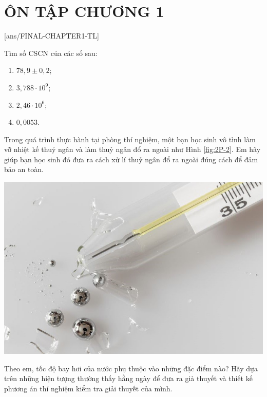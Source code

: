 \section{ÔN TẬP CHƯƠNG 1}
[ans/FINAL-CHAPTER1-TL]
\setcounter{ex}{0}
\begin{ex}
	Tìm số CSCN của các số sau:
	\begin{enumerate}[label=\alph*)]
		\item $78,9\pm 0,2$;
		\item $3,788\cdot10^9$;
		\item $2,46\cdot10^6$;
		\item $0,0053$.
	\end{enumerate}
\end{ex}

\begin{ex}
	Trong quá trình thực hành tại phòng thí nghiệm, một bạn học sinh vô tình làm vỡ nhiệt kế thuỷ ngân và làm thuỷ ngân đổ ra ngoài như Hình \ref{fig:2P-2}. Em hãy giúp bạn học sinh đó đưa ra cách xử lí thuỷ ngân đổ ra ngoài đúng cách để đảm bảo an toàn.
	\begin{center}
		\includegraphics[width=0.3\linewidth]{figs/FINAL-CHAPTER1-2}
		\label{fig:2P-2}
	\end{center}
\end{ex}

\begin{ex}
	Theo em, tốc độ bay hơi của nước phụ thuộc vào những đặc điểm nào? Hãy dựa trên những hiện tượng thường thấy hằng ngày để đưa ra giả thuyết và thiết kế phương án thí nghiệm kiểm tra giải thuyết của mình.
\end{ex}


